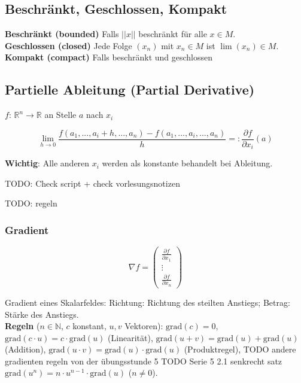 \subsection{Beschränkt, Geschlossen, Kompakt}

\textbf{Beschränkt (bounded)} Falls $||x||$ beschränkt für alle $x \in M$.\\

\textbf{Geschlossen (closed)} Jede Folge $(x_n)$ mit $x_n \in M$ ist $\lim (x_n) \in M$.\\

\textbf{Kompakt (compact)} Falls beschränkt und geschlossen\\

\subsection{Partielle Ableitung (Partial Derivative)}

$f$: $\mathbb{R}^n \rightarrow \mathbb{R}$ an Stelle $a$ nach $x_i$

\[
    \lim_{h \rightarrow 0} \frac{f(a_1, ..., a_i + h, ..., a_n) - f(a_1, ..., a_i, ..., a_n)}{h} =: \frac{\partial f}{\partial x_i}(a)
\]

\textbf{Wichtig}: Alle anderen $x_i$ werden als konstante behandelt bei Ableitung.

TODO: Check script + check vorlesungsnotizen

TODO: regeln

\subsubsection{Gradient}

\[
    \nabla f =
        \begin{pmatrix}
            \frac{\partial f}{\partial x_1}\\
            \vdots\\
            \frac{\partial f}{\partial x_n}
        \end{pmatrix}
\]

Gradient eines Skalarfeldes: Richtung: Richtung des steilten Anstiegs; Betrag: Stärke des Anstiegs.\\

\textbf{Regeln} ($n \in \mathbb{N}$, $c$ konstant, $u, v$ Vektoren):
$\text{grad}(c) = 0$,
$\text{grad}(c \cdot u) = c \cdot \text{grad}(u)$ (Linearität),
$\text{grad}(u + v) = \text{grad}(u) + \text{grad}(u)$ (Addition),
$\text{grad}(u \cdot v) = \text{grad}(u) \cdot \text{grad}(u)$
(Produktregel),
TODO andere gradienten regeln von der übungsstunde 5
TODO Serie 5 2.1 senkrecht satz 
$\text{grad}(u^n) = n \cdot u^{n-1} \cdot \text{grad}(u)$ ($n\neq 0$).\\


